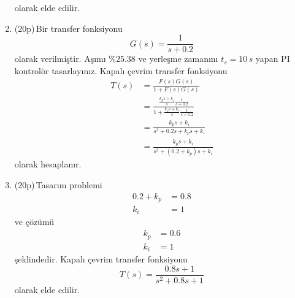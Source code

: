 \begin{enumerate}[\bfseries S1.]
	      olarak elde edilir.
	\item (20p)\,Bir transfer fonksiyonu
	      \begin{equation}
		      G(s)=\frac{1}{s+0.2}
	      \end{equation}
	      olarak verilmiştir. Aşımı $\%25.38$ ve yerleşme zamanını $t_s=10\,s$ yapan PI kontrolör tasarlayınız. Kapalı çevrim transfer fonksiyonu
	      \begin{equation}
		      \begin{split}
			      T(s) & =\frac{F(s)G(s)}{1+F(s)G(s)}                                                   \\
			           & =\frac{\frac{k_ps+k_i}{s}\frac{1}{s+0.2}}{1+\frac{k_ps+k_i}{s}\frac{1}{s+0.2}} \\
			           & =\frac{k_ps+k_i}{s^2+0.2s+k_ps+k_i}                                            \\
			           & =\frac{k_ps+k_i}{s^2+(0.2+k_p)s+k_i}
		      \end{split}
	      \end{equation}
	      olarak hesaplanır.
	\item (20p)\,Tasarım problemi
	      \begin{equation}
		      \begin{split}
			      0.2+k_p & =0.8  \\
			      k_i     & =1
		      \end{split}
	      \end{equation}
	      ve çözümü
	      \begin{equation}
		      \begin{split}
			      k_p & =0.6 \\
			      k_i & =1
		      \end{split}
	      \end{equation}
	      şeklindedir. Kapalı çevrim transfer fonksiyonu
	      \begin{equation}
		      T(s)=\frac{0.8s+1}{s^2+0.8s+1}
	      \end{equation}
	      olarak elde edilir.
\end{enumerate}
